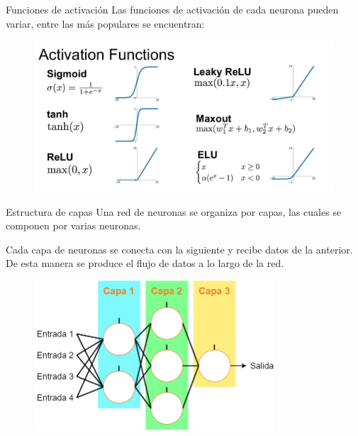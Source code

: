 \begin{frame}{Funciones de activación}
Las \alert{funciones de activación} de cada neurona pueden variar, entre las más populares se encuentran:

\begin{figure}
\centering
    \includegraphics[width=\textwidth]{Slides/figures/Tema 3/Activations.png}
    \caption{\cite{Activations}}
\end{figure}
\end{frame}

\begin{frame}{Estructura de capas}
Una red de neuronas  se organiza por \alert{capas}, las cuales se componen por varias \alert{neuronas}.

Cada \alert{capa de neuronas} se conecta con la siguiente y recibe \alert{datos} de la anterior. De esta manera se produce el \alert{flujo de datos} a lo largo de la red.

\begin{figure}
\centering
    \includegraphics[width=0.8\textwidth]{Slides/figures/Tema 3/LayerStructure.png}
\end{figure}
\end{frame}

